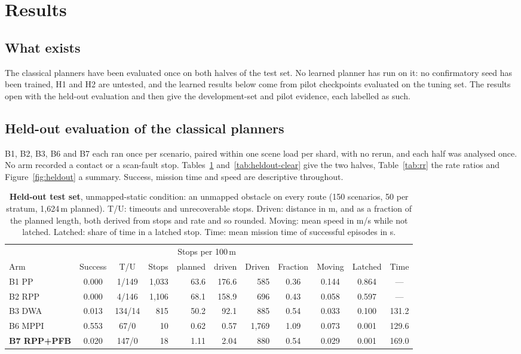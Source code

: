 \documentclass[11pt]{article}
\theoremstyle{definition}
\begin{document}
\section{Results}\label{sec:results}

\subsection{What exists}
The classical planners have been evaluated once on both halves of the test set. No learned planner has run on
it: no confirmatory seed has been trained, H1 and H2 are untested, and the learned results below come from
pilot checkpoints evaluated on the tuning set. The results open with the held-out evaluation and then give the
development-set and pilot evidence, each labelled as such.

\subsection{Held-out evaluation of the classical planners}\label{sec:res-heldout}
B1, B2, B3, B6 and B7 each ran once per scenario, paired within one scene load per shard, with no rerun, and
each half was analysed once. No arm recorded a contact or a scan-fault stop. Tables~\ref{tab:heldout-obstacle}
and~\ref{tab:heldout-clear} give the two halves, Table~\ref{tab:rr} the rate ratios and
Figure~\ref{fig:heldout} a summary. Success, mission time and speed are descriptive throughout.

\begin{table}[!htbp]
\centering
\caption{\textbf{Held-out test set}, unmapped-static condition: an unmapped obstacle on every route (150
scenarios, 50 per stratum, 1{,}624\,m planned). T/U: timeouts and unrecoverable stops. Driven: distance in m, and
as a fraction of the planned length, both derived from stops and rate and so rounded. Moving: mean speed in m/s
while not latched. Latched: share of time in a
latched stop. Time: mean mission time of successful episodes in s.}
\label{tab:heldout-obstacle}
\footnotesize
\setlength{\tabcolsep}{3.2pt}
\begin{tabular}{lccrrrrcccc}
\toprule
& & & & \multicolumn{2}{c}{Stops per 100\,m} & & & & &\\
\cmidrule(lr){5-6}
Arm & Success & T/U & Stops & planned & driven & Driven & Fraction & Moving & Latched & Time\\
\midrule
B1 PP & 0.000 & 1/149 & 1{,}033 & 63.6 & 176.6 & 585 & 0.36 & 0.144 & 0.864 & ---\\
B2 RPP & 0.000 & 4/146 & 1{,}106 & 68.1 & 158.9 & 696 & 0.43 & 0.058 & 0.597 & ---\\
B3 DWA & 0.013 & 134/14 & 815 & 50.2 & 92.1 & 885 & 0.54 & 0.033 & 0.100 & 131.2\\
B6 MPPI & 0.553 & 67/0 & 10 & 0.62 & 0.57 & 1{,}769 & 1.09 & 0.073 & 0.001 & 129.6\\
\textbf{B7 RPP+PFB} & 0.020 & 147/0 & 18 & 1.11 & 2.04 & 880 & 0.54 & 0.029 & 0.001 & 169.0\\
\bottomrule
\end{tabular}
\end{table}
\end{document}

